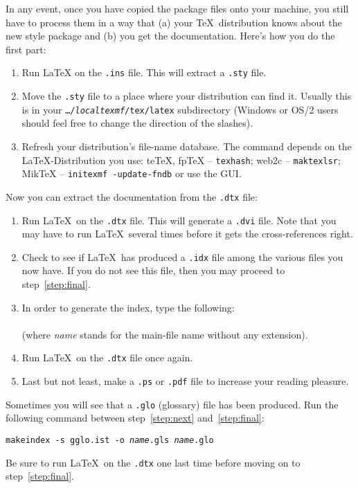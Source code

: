 In any event, once you have copied the package files onto your
machine, you still have to process them in a way that (a) your
\TeX\ distribution knows about the new style package and (b) you get
the documentation.  Here's how you do the first part:

\begin{enumerate}
\item Run \LaTeX{} on the \texttt{.ins} file. This will
  extract a \texttt{.sty} file.
\item Move the \texttt{.sty} file to a place where your distribution
  can find it. Usually this is in your \texttt{\ldots/\emph{localtexmf}/tex/latex}
  subdirectory (Windows or OS/2 users should feel free to change the
  direction of the slashes).
\item Refresh your distribution's file-name database. The command
  depends on the \LaTeX-Distribution you use:
  teTeX, fpTeX -- \texttt{texhash}; web2c -- \texttt{maktexlsr};
  MikTeX -- \texttt{initexmf -update-fndb} or use the GUI.
\end{enumerate}

\noindent Now you can extract the documentation from the
\texttt{.dtx} file:

\begin{enumerate}
\item Run \LaTeX\ on the \texttt{.dtx} file.  This will generate a
  \texttt{.dvi} file. Note that you may have to run \LaTeX\
  several times before it gets the cross-references right.
\item Check to see if \LaTeX\ has produced a \texttt{.idx} file
  among the various files you now have.
  If you do not see this file, then you may proceed to
  step~\ref{step:final}.
\item In order to generate the index, type the following:\\
        \\
        (where \textit{name} stands for the main-file name without any
    extension).
 \item Run \LaTeX\ on the \texttt{.dtx} file once again. \label{step:next}
    
\item Last but not least, make a \texttt{.ps} or \texttt{.pdf}
  file to increase your reading pleasure.\label{step:final}
  
\end{enumerate}

Sometimes you will see that a \texttt{.glo}
(glossary) file has been produced. Run the following
command between
step~\ref{step:next} and~\ref{step:final}:

\noindent\texttt{makeindex -s gglo.ist -o \textit{name}.gls \textit{name}.glo}

\noindent Be sure to run \LaTeX\ on the \texttt{.dtx} one last
time before moving on to step~\ref{step:final}.











